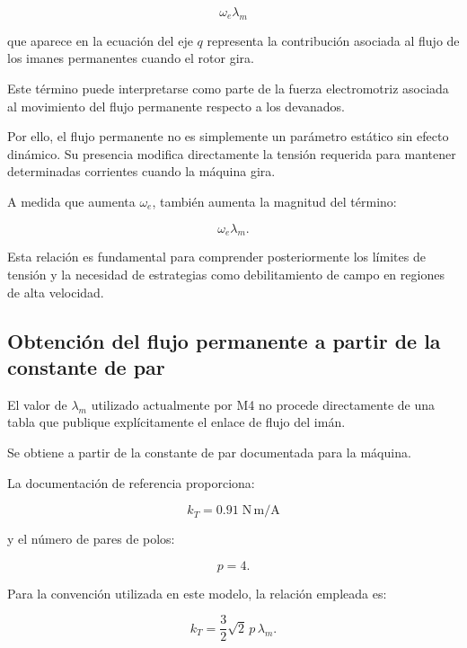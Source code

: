 \begin{equation}
\omega_e\lambda_m
\end{equation}

que aparece en la ecuación del eje $q$ representa la contribución asociada al flujo de los imanes permanentes cuando el rotor gira.

Este término puede interpretarse como parte de la fuerza electromotriz asociada al movimiento del flujo permanente respecto a los devanados.

Por ello, el flujo permanente no es simplemente un parámetro estático sin efecto dinámico. Su presencia modifica directamente la tensión requerida para mantener determinadas corrientes cuando la máquina gira.

A medida que aumenta $\omega_e$, también aumenta la magnitud del término:

\begin{equation}
\omega_e\lambda_m.
\end{equation}

Esta relación es fundamental para comprender posteriormente los límites de tensión y la necesidad de estrategias como debilitamiento de campo en regiones de alta velocidad.

\subsection{Obtención del flujo permanente a partir de la constante de par}

El valor de $\lambda_m$ utilizado actualmente por M4 no procede directamente de una tabla que publique explícitamente el enlace de flujo del imán.

Se obtiene a partir de la constante de par documentada para la máquina.

La documentación de referencia proporciona:

\begin{equation}
k_T=0.91\;\mathrm{N\,m/A}
\end{equation}

y el número de pares de polos:

\begin{equation}
p=4.
\end{equation}

Para la convención utilizada en este modelo, la relación empleada es:

\begin{equation}
k_T
=
\frac{3}{2}\sqrt{2}\,p\,\lambda_m.
\end{equation}


